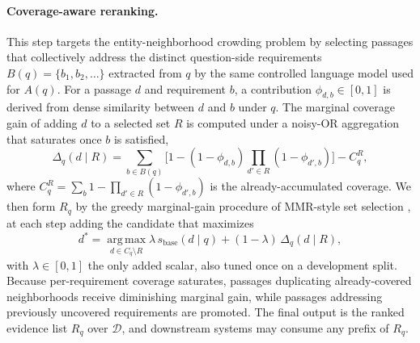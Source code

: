 \paragraph{Coverage-aware reranking.}
This step targets the entity-neighborhood crowding problem by
selecting passages that collectively address the distinct
question-side requirements $B(q)=\{b_1,b_2,\ldots\}$ extracted from
$q$ by the same controlled language model used for $A(q)$. For a
passage $d$ and requirement $b$, a contribution
$\phi_{d,b}\in[0,1]$ is derived from dense similarity between $d$
and $b$ under $q$. The marginal coverage gain of adding $d$ to a
selected set $R$ is computed under a noisy-OR aggregation that
saturates once $b$ is satisfied,
\begin{equation}
\label{eq:marginal-gain}
\Delta_q(d \mid R)
=
\sum_{b \in B(q)}
\bigl[1-(1-\phi_{d,b})\textstyle\prod_{d'\in R}(1-\phi_{d',b})\bigr]
- C_q^{R},
\end{equation}
where $C_q^{R}=\sum_b 1-\prod_{d'\in R}(1-\phi_{d',b})$ is the
already-accumulated coverage. We then form $R_q$ by the greedy
marginal-gain procedure of MMR-style set selection
\citep{carbonell1998mmr,lin2011submodular}, at each step adding the
candidate that maximizes
\begin{equation}
\label{eq:greedy-rerank}
d^{*}
=
\operatorname*{arg\,max}_{d \in C_q \setminus R}
\lambda\,s_{\mathrm{base}}(d \mid q)
+
(1-\lambda)\,\Delta_q(d \mid R),
\end{equation}
with $\lambda \in [0,1]$ the only added scalar, also tuned once on a
development split. Because per-requirement coverage saturates,
passages duplicating already-covered neighborhoods receive
diminishing marginal gain, while passages addressing previously
uncovered requirements are promoted. The final output is the ranked
evidence list $R_q$ over $\mathcal{D}$, and downstream systems may
consume any prefix of $R_q$.
